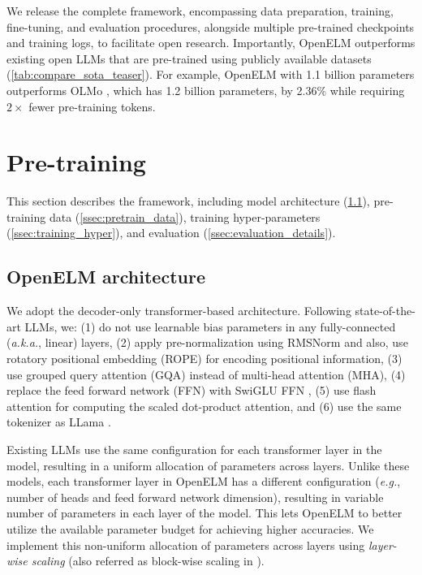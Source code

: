\documentclass[10pt,twocolumn,letterpaper]{article}
\makeatletter
\newcommand{\model}{OpenELM\@\xspace}
\makeatother
\begin{document}
We release the complete framework, encompassing data preparation, training, fine-tuning, and evaluation procedures, alongside multiple pre-trained checkpoints and training logs, to facilitate open research. Importantly, \model outperforms existing open LLMs that are pre-trained using publicly available datasets (\cref{tab:compare_sota_teaser}). For example, \model with 1.1 billion parameters outperforms OLMo \cite{groeneveld2024olmo}, which has 1.2 billion parameters, by 2.36\% while requiring $2\times$ fewer pre-training tokens.

\section{Pre-training}
This section describes the framework, including model architecture (\cref{ssec:model_arch}), pre-training data (\cref{ssec:pretrain_data}), training hyper-parameters (\cref{ssec:training_hyper}), and evaluation (\cref{ssec:evaluation_details}).

\subsection{\model architecture}
\label{ssec:model_arch}
We adopt the decoder-only transformer-based architecture. Following state-of-the-art LLMs, we: (1) do not use learnable bias parameters in any fully-connected (\textit{a.k.a.}, linear) layers, (2) apply pre-normalization using RMSNorm \cite{zhang2019root} and also, use rotatory positional embedding (ROPE) \cite{su2024roformer} for encoding positional information, (3) use grouped query attention (GQA) \cite{ainslie2023gqa} instead of multi-head attention (MHA), (4) replace the feed forward network (FFN)  with SwiGLU FFN \cite{shazeer2020glu}, (5) use flash attention \cite{dao2022flashattention} for computing the scaled dot-product attention, and (6) use the same tokenizer as LLama \cite{touvron2023llama}.

Existing LLMs use the same configuration for each transformer layer in the model, resulting in a uniform allocation of parameters across layers. Unlike these models, each transformer layer in \model has a different configuration (\textit{e.g.}, number of heads and feed forward network dimension), resulting in variable number of parameters in each layer of the model. This lets \model to better utilize the available parameter budget for achieving higher accuracies. We implement this non-uniform allocation of parameters across layers using \emph{layer-wise scaling} (also referred as block-wise scaling in \cite{mehta2020delight}).
\end{document}
